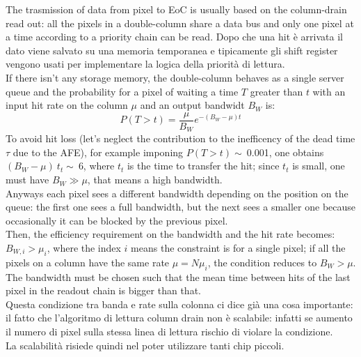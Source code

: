    The trasmission of data from pixel to EoC is usually based on the column-drain read out: all the pixels in a double-column share a data bus and only one pixel at a time according to a priority chain can be read. Dopo che una hit è arrivata il dato viene salvato su una memoria temporanea e tipicamente gli shift register vengono usati per implementare la logica della priorità di lettura.\\
   If there isn't any storage memory, the double-column behaves as a single server queue and the probability for a pixel of waiting a time $T$ greater than $t$ with an input hit rate on the column $\mu$ and an output bandwidt $B_W$ is\cite{Garcia-Review}:
   \begin{equation}
   P(T > t) = \frac{\mu}{B_W} e^{-( B_W-\mu )t}
   \label{eq:priority_chain_no_buffer}
   \end{equation}
   To avoid hit loss (let's neglect the contribution to the inefficency of the dead time $\tau$ due to the AFE), for example imponing $P(T > t)\sim\:$0.001, one obtains $(B_W -\mu)\:t_t\sim\:$6, where $t_t$ is the time to transfer the hit; since $t_t$ is small, one must have $B_W \gg \mu$, that means a high bandwidth.\\

   Anyways each pixel sees a different bandwidth depending on the position on the queue: the first one sees a full bandwidth, but the next sees a smaller one because occasionally it can be blocked by the previous pixel.\\
   Then, the efficiency requirement on the bandwidth and the hit rate becomes: $B_{W,i} > \mu_{i}$, where the index $i$ means the constraint is for a single pixel; if all the pixels on a column have the same rate $\mu = N\mu_{i}$, the condition reduces to $B_{W} > \mu$.
   The bandwidth must be chosen such that the mean time between hits of the last pixel in the readout chain is bigger than that.\\
   Questa condizione tra banda e rate sulla colonna ci dice già una cosa importante: il fatto che l'algoritmo di lettura column drain non è scalabile: infatti se aumento il numero di pixel sulla stessa linea di lettura rischio di violare la condizione.\\
   La scalabilità risiede quindi nel poter utilizzare tanti chip piccoli.\\


